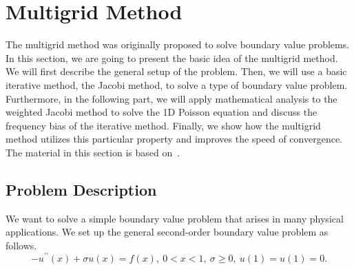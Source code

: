 \documentclass[letterpaper,12pt]{article}
\begin{document}
\section{Multigrid Method}
The multigrid method was originally proposed to solve boundary value problems. In this section, we are going to present the basic idea of the multigrid method. We will first describe the general setup of the problem. Then, we will use a basic iterative method, the Jacobi method, to solve a type of boundary value problem. Furthermore, in the following part, we will apply mathematical analysis to the weighted Jacobi method to solve the 1D Poisson equation and discuss the frequency bias of the iterative method. Finally, we show how the multigrid method utilizes this particular property and improves the speed of convergence. The material in this section is based on~\cite{10.5555/357695}.



\subsection{Problem Description}
We want to solve a simple boundary value problem that arises in many physical applications. We set up the general second-order boundary value problem as follows.
\begin{equation}\label{eq:main PDE}
-u^{\prime \prime}(x)+\sigma u(x)=f(x), \ 0<x<1, \ \sigma \geq 0,\ u(1)=u(1)=0.
\end{equation}
\end{document}
